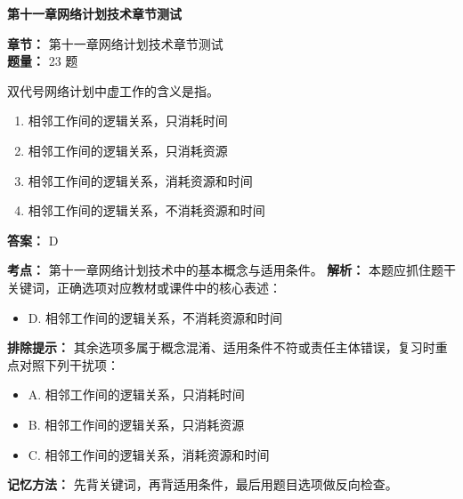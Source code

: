 \documentclass[UTF8,fontset=fandol,11pt]{ctexart}
\newcommand{\chaptertitle}[1]{\vspace{0.5em}\begin{tcolorbox}[enhanced,colback=deepblue,colframe=deepblue,arc=2mm,boxrule=0pt]\begin{center}\Large\bfseries\color{white}#1\end{center}\end{tcolorbox}\vspace{0.5em}}
\begin{document}
\vspace{0.2em}

\chaptertitle{第十一章网络计划技术章节测试}
\begin{mainbox}
\textbf{\textcolor{mainblue}{章节：}} 第十一章网络计划技术章节测试\\
\textbf{\textcolor{answerred}{题量：}} 23 题
\end{mainbox}

\begin{quizbox}[title={第 1 题}]
双代号网络计划中虚工作的含义是指。\\
\begin{enumerate}[label=\Alph*.]
\item 相邻工作间的逻辑关系，只消耗时间
\item 相邻工作间的逻辑关系，只消耗资源
\item 相邻工作间的逻辑关系，消耗资源和时间
\item 相邻工作间的逻辑关系，不消耗资源和时间
\end{enumerate}
\textbf{答案：} D
\vspace{0.25em}
\begin{answerbox}[title={考点解析}]
\textbf{考点：} 第十一章网络计划技术中的基本概念与适用条件。
\textbf{解析：} 本题应抓住题干关键词，正确选项对应教材或课件中的核心表述：
\begin{itemize}
\item D. 相邻工作间的逻辑关系，不消耗资源和时间
\end{itemize}
\textbf{排除提示：} 其余选项多属于概念混淆、适用条件不符或责任主体错误，复习时重点对照下列干扰项：
\begin{itemize}
\item A. 相邻工作间的逻辑关系，只消耗时间
\item B. 相邻工作间的逻辑关系，只消耗资源
\item C. 相邻工作间的逻辑关系，消耗资源和时间
\end{itemize}
\textbf{记忆方法：} 先背关键词，再背适用条件，最后用题目选项做反向检查。
\end{answerbox}
\end{quizbox}

\vspace{0.2em}
\end{document}
